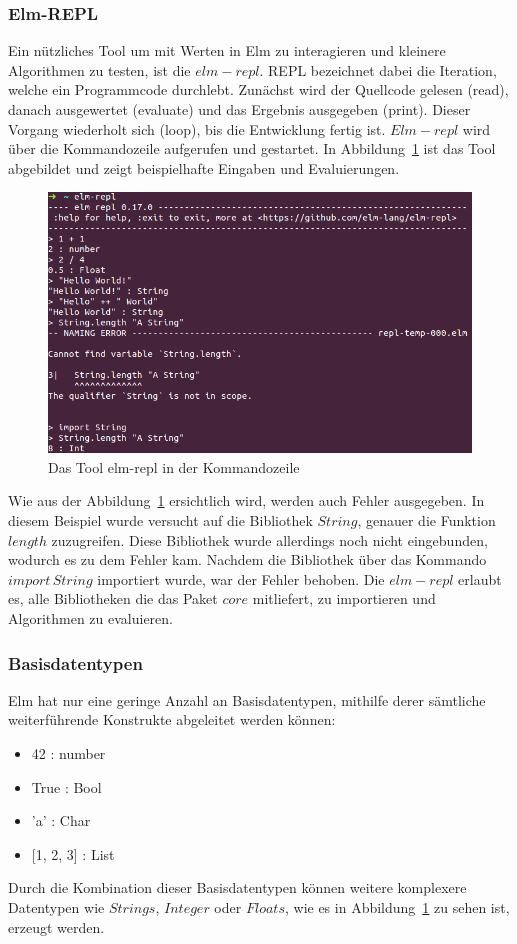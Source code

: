 \subsubsection{Elm-REPL}
\label{sec:elm-repl}
Ein nützliches Tool um mit Werten in Elm zu interagieren und kleinere Algorithmen zu testen, ist die $elm-repl$. \ac{REPL} bezeichnet dabei die Iteration, welche ein Programmcode durchlebt. Zunächst wird der Quellcode gelesen (read), danach ausgewertet (evaluate) und das Ergebnis ausgegeben (print). Dieser Vorgang wiederholt sich (loop), bis die Entwicklung fertig ist. $Elm-repl$ wird über die Kommandozeile aufgerufen und gestartet. In Abbildung~\ref{fig:elm-repl} ist das Tool abgebildet und zeigt beispielhafte Eingaben und Evaluierungen.
\begin{figure}[h]
\centering
\includegraphics[scale=0.5]{img/elm-repl.png}
\caption{Das Tool elm-repl in der Kommandozeile}\label{fig:elm-repl}
\end{figure}
Wie aus der Abbildung~\ref{fig:elm-repl} ersichtlich wird, werden auch Fehler ausgegeben. In diesem Beispiel wurde versucht auf die Bibliothek $String$, genauer die Funktion $length$ zuzugreifen. Diese Bibliothek wurde allerdings noch nicht eingebunden, wodurch es zu dem Fehler kam. Nachdem die Bibliothek über das Kommando $import\,String$ importiert wurde, war der Fehler behoben. Die $elm-repl$ erlaubt es, alle Bibliotheken die das Paket $core$ mitliefert, zu importieren und Algorithmen zu evaluieren.

\subsubsection{Basisdatentypen}
\label{sec:Basisdatentypen}
Elm hat nur eine geringe Anzahl an Basisdatentypen, mithilfe derer sämtliche weiterführende Konstrukte abgeleitet werden können:
\begin{itemize}
	\item 42 : number
	\item True : Bool
	\item 'a' : Char
	\item {[1, 2, 3] : List}
\end{itemize}
Durch die Kombination dieser Basisdatentypen können weitere komplexere Datentypen wie $Strings$, $Integer$ oder $Floats$, wie es in Abbildung~\ref{fig:elm-repl} zu sehen ist, erzeugt werden.

